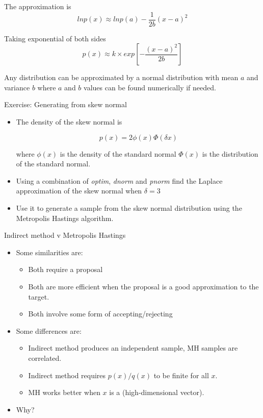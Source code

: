 \documentclass[10pt]{beamer}
\begin{document}
\begin{frame}
The approximation is
\begin{equation*}
lnp(x)\approx lnp(a)-\frac{1}{2b}(x-a)^2
\end{equation*}

Taking exponential of both sides
\begin{equation*}
p(x)\approx k\times exp\left[-\frac{(x-a)^2}{2b}\right]
\end{equation*}

Any distribution can be approximated by a normal distribution with mean $a$ and variance $b$ where $a$ and $b$ values can be found numerically if needed.
\end{frame}
\begin{frame}{Exercise: Generating from skew normal}
\begin{itemize}
\item The density of the skew normal is

\begin{equation}
p(x)=2\phi(x)\Phi(\delta x)
\end{equation}

where $\phi(x)$ is the density of the standard normal $\Phi(x)$ is the distribution of the standard normal.

\item Using a combination of {\em optim}, {\em dnorm} and {\em pnorm} find the Laplace approximation of the skew normal when $\delta=3$

\item Use it to generate a sample from the skew normal distribution using the Metropolis Hastings algorithm.
\end{itemize}
\end{frame}
\begin{frame}{Indirect method v Metropolis Hastings}
\begin{itemize}
\item Some similarities are:

\begin{itemize}
\item Both require a proposal
\item Both are more efficient when the proposal is a good approximation to the target.
\item Both involve some form of accepting/rejecting
\end{itemize}

\item Some differences are:

\begin{itemize}
\item Indirect method produces an independent sample, MH samples are correlated.
\item Indirect method requires $p(x)/q(x)$ to be finite for all $x$.
\item MH works better when $x$ is a (high-dimensional vector).
\end{itemize}

\item Why?
\end{itemize}
\end{frame}
\end{document}
